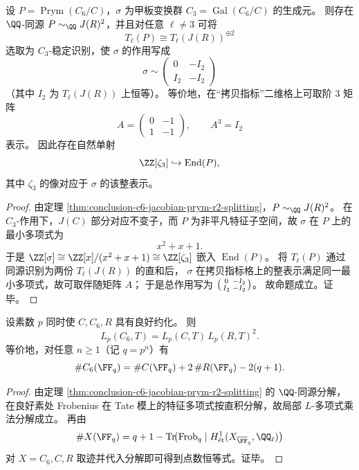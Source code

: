 \begin{proposition}\label{prop:conclusion-prym-c3-integral-representation}
设 \(P=\operatorname{Prym}(C_6/C)\)，\(\sigma\) 为甲板变换群 \(C_3=\operatorname{Gal}(C_6/C)\) 的生成元。
则存在 \(\QQ\)-同源 \(P\sim_{\QQ}J(R)^2\)，并且对任意 \(\ell\neq 3\) 可将
\[
T_\ell(P)\cong T_\ell(J(R))^{\oplus 2}
\]
选取为 \(C_3\)-稳定识别，使 \(\sigma\) 的作用写成
\[
\sigma\sim
\begin{pmatrix}
0&-I_2\\
I_2&-I_2
\end{pmatrix}
\]
（其中 \(I_2\) 为 \(T_\ell(J(R))\) 上恒等）。
等价地，在“拷贝指标”二维格上可取阶 \(3\) 矩阵
\[
A=
\begin{pmatrix}
0&-1\\
1&-1
\end{pmatrix},
\qquad A^3=I_2
\]
表示。
因此存在自然单射
\[
\ZZ[\zeta_3]\hookrightarrow \operatorname{End}(P),
\]
其中 \(\zeta_3\) 的像对应于 \(\sigma\) 的该整表示。
\end{proposition}
\begin{proof}
由定理 \ref{thm:conclusion-c6-jacobian-prym-r2-splitting}，\(P\sim_{\QQ}J(R)^2\)。
在 \(C_3\)-作用下，\(J(C)\) 部分对应不变子，而 \(P\) 为非平凡特征子空间，故 \(\sigma\) 在 \(P\) 上的最小多项式为
\[
x^2+x+1.
\]
于是 \(\ZZ[\sigma]\cong \ZZ[x]/(x^2+x+1)\cong \ZZ[\zeta_3]\) 嵌入 \(\operatorname{End}(P)\)。
将 \(T_\ell(P)\) 通过同源识别为两份 \(T_\ell(J(R))\) 的直和后，
\(\sigma\) 在拷贝指标格上的整表示满足同一最小多项式，故可取伴随矩阵 \(A\)；
于是总作用写为 \(\begin{psmallmatrix}0&-I_2\\ I_2&-I_2\end{psmallmatrix}\)。
故命题成立。证毕。
\end{proof}

\begin{corollary}\label{cor:conclusion-c6-euler-factor-pointcount}
设素数 \(p\) 同时使 \(C,C_6,R\) 具有良好约化。
则
\[
L_p(C_6,T)=L_p(C,T)\,L_p(R,T)^2.
\]
等价地，对任意 \(n\ge 1\)（记 \(q=p^n\)）有
\[
\#C_6(\FF_q)
=
\#C(\FF_q)+2\,\#R(\FF_q)-2(q+1).
\]
\end{corollary}
\begin{proof}
由定理 \ref{thm:conclusion-c6-jacobian-prym-r2-splitting} 的 \(\QQ\)-同源分解，
在良好素处 Frobenius 在 Tate 模上的特征多项式按直积分解，故局部 \(L\)-多项式乘法分解成立。
再由
\[
\#X(\FF_q)=q+1-\operatorname{Tr}\!\bigl(\operatorname{Frob}_q\mid H^1_{\mathrm{\acute et}}(X_{\overline{\FF}_q},\QQ_\ell)\bigr)
\]
对 \(X=C_6,C,R\) 取迹并代入分解即可得到点数恒等式。证毕。
\end{proof}

